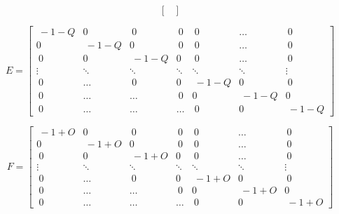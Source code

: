 \documentclass[a4paper,fleqn,10pt]{report}
\begin{document}
\begin{CJK*}{UTF8}{bsmi}
\begin{equation*}
\begin{bmatrix}
\end{bmatrix}
\end{equation*}


\begin{equation*}
E = 
\begin{bmatrix}
	~-1-Q & 0 & ~0 & ~0 & ~0 & \ldots & ~0 \\
        0 & ~-1-Q & 0 & ~0 & ~0 & \ldots & ~0 \\
        ~0 & 0 & ~-1-Q & 0 & ~0 & \ldots & ~0 \\
        \vdots & \ddots & \ddots & \ddots & \ddots & \ddots & \vdots \\
        ~0 & \ldots & ~0 & 0 & ~-1-Q & 0 & ~0 \\
        ~0 & \ldots & \ldots & ~0 & 0 & ~-1-Q & 0 \\
        ~0 & \ldots & \ldots & \ldots & ~0 & 0 & ~-1-Q

\end{bmatrix}
\end{equation*}

\begin{equation*}
F = 
\begin{bmatrix}
	~-1+O & 0 & ~0 & ~0 & ~0 & \ldots & ~0 \\
        0 & ~-1+O & 0 & ~0 & ~0 & \ldots & ~0 \\
        ~0 & 0 & ~-1+O & 0 & ~0 & \ldots & ~0 \\
        \vdots & \ddots & \ddots & \ddots & \ddots & \ddots & \vdots \\
        ~0 & \ldots & ~0 & 0 & ~-1+O & 0 & ~0 \\
        ~0 & \ldots & \ldots & ~0 & 0 & ~-1+O & 0 \\
        ~0 & \ldots & \ldots & \ldots & ~0 & 0 & ~-1+O

\end{bmatrix}
\end{equation*}

\newpage


\end{CJK*}
\end{document}
